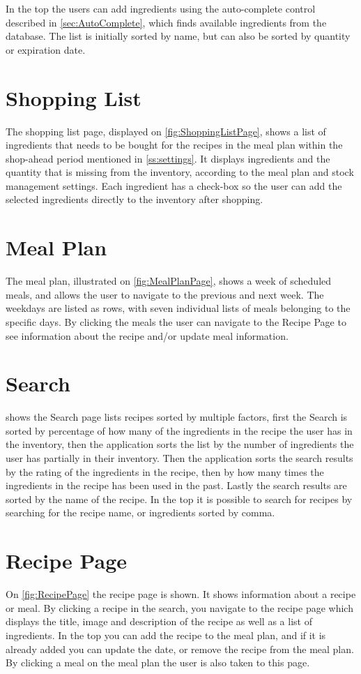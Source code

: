 In the top the users can add ingredients using the auto-complete control described in \cref{sec:AutoComplete}, which finds available ingredients from the database. The list is initially sorted by name, but can also be sorted by quantity or expiration date.

\section{Shopping List}
The shopping list page, displayed on \cref{fig:ShoppingListPage}, shows a list of ingredients that needs to be bought for the recipes in the meal plan within the shop-ahead period mentioned in \cref{ss:settings}. It displays ingredients and the quantity that is missing from the inventory, according to the meal plan and stock management settings. Each ingredient has a check-box so the user can add the selected ingredients directly to the inventory after shopping.

\section{Meal Plan}
The meal plan, illustrated on \cref{fig:MealPlanPage}, shows a week of scheduled meals, and allows the user to navigate to the previous and next week. The weekdays are listed as rows, with seven individual lists of meals belonging to the specific days. By clicking the meals the  user can navigate to the Recipe Page to see information about the recipe and/or update meal information.

\section{Search}
 shows the Search page lists recipes sorted by multiple factors, first the Search is sorted by percentage of how many of the ingredients in the recipe the user has in the inventory, then the application sorts the list by the number of ingredients the user has partially in their inventory. Then the application sorts the search results by the rating of the ingredients in the recipe, then by how many times the ingredients in the recipe has been used in the past. Lastly the search results are sorted by the name of the recipe.
In the top it is possible to search for recipes by searching for the recipe name, or ingredients sorted by comma.

\section{Recipe Page}
On \cref{fig:RecipePage} the recipe page is shown. It shows information about a recipe or meal. By clicking a recipe in the search, you navigate to the recipe page which displays the title, image and description of the recipe as well as a list of ingredients. In the top you can add the recipe to the meal plan, and if it is already added you can update the date, or remove the recipe from the meal plan.
By clicking a meal on the meal plan the user is also taken to this page.

